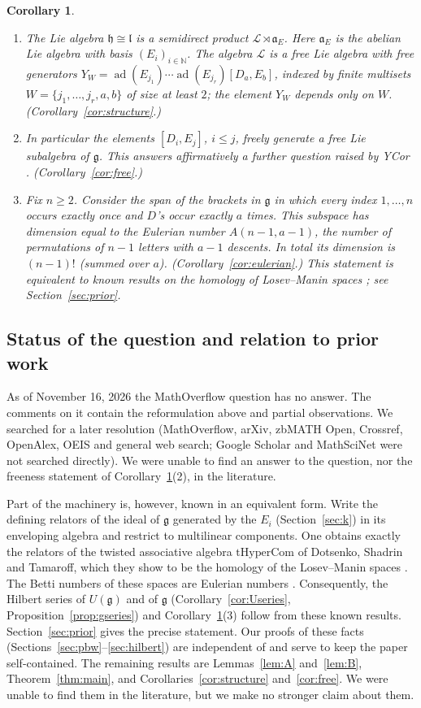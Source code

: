 \documentclass[11pt]{amsart}
\newtheorem{corollary}[theorem]{Corollary}
\theoremstyle{definition}
\theoremstyle{remark}
\newcommand{\N}{\mathbb{N}}
\newcommand{\g}{\mathfrak{g}}
\newcommand{\h}{\mathfrak{h}}
\newcommand{\lie}{\mathfrak{l}}
\newcommand{\af}{\mathfrak{a}}
\newcommand{\Lf}{\mathcal{L}}
\newcommand{\ad}{\operatorname{ad}}
\begin{document}
\begin{corollary}\label{cor:intro}
\begin{enumerate}
\item The Lie algebra $\h\cong\lie$ is a semidirect product $\Lf\rtimes\af_E$. Here $\af_E$ is the abelian Lie algebra with basis $(E_i)_{i\in\N}$. The algebra $\Lf$ is a free Lie algebra with free generators $Y_W=\ad(E_{j_1})\cdots\ad(E_{j_r})[D_a,E_b]$, indexed by finite multisets $W=\{j_1,\dots,j_r,a,b\}$ of size at least $2$; the element $Y_W$ depends only on $W$. (Corollary~\ref{cor:structure}.)
\item In particular the elements $[D_i,E_j]$, $i\le j$, freely generate a free Lie subalgebra of $\g$. This answers affirmatively a further question raised by YCor \cite{YCor}. (Corollary~\ref{cor:free}.)
\item Fix $n\ge 2$. Consider the span of the brackets in $\g$ in which every index $1,\dots,n$ occurs exactly once and $D$'s occur exactly $a$ times. This subspace has dimension equal to the Eulerian number $A(n-1,a-1)$, the number of permutations of $n-1$ letters with $a-1$ descents. In total its dimension is $(n-1)!$ (summed over $a$). (Corollary~\ref{cor:eulerian}.) This statement is equivalent to known results on the homology of Losev--Manin spaces \cite{LM,DST}; see Section~\ref{sec:prior}.
\end{enumerate}
\end{corollary}

\subsection*{Status of the question and relation to prior work}
As of November 16, 2026 the MathOverflow question has no answer. The comments on it contain the reformulation above and partial observations. We searched for a later resolution (MathOverflow, arXiv, zbMATH Open, Crossref, OpenAlex, OEIS and general web search; Google Scholar and MathSciNet were not searched directly). We were unable to find an answer to the question, nor the freeness statement of Corollary~\ref{cor:intro}(2), in the literature.

Part of the machinery is, however, known in an equivalent form. Write the defining relators of the ideal of $\g$ generated by the $E_i$ (Section~\ref{sec:k}) in its enveloping algebra and restrict to multilinear components. One obtains exactly the relators of the twisted associative algebra $\mathrm{tHyperCom}$ of Dotsenko, Shadrin and Tamaroff, which they show to be the homology of the Losev--Manin spaces \cite[Prop.~2.4.2]{DST}. The Betti numbers of these spaces are Eulerian numbers \cite[Thm.~2.3]{LM}. Consequently, the Hilbert series of $U(\g)$ and of $\g$ (Corollary~\ref{cor:Useries}, Proposition~\ref{prop:gseries}) and Corollary~\ref{cor:intro}(3) follow from these known results. Section~\ref{sec:prior} gives the precise statement. Our proofs of these facts (Sections~\ref{sec:pbw}--\ref{sec:hilbert}) are independent of \cite{LM,DST} and serve to keep the paper self-contained. The remaining results are Lemmas~\ref{lem:A} and~\ref{lem:B}, Theorem~\ref{thm:main}, and Corollaries~\ref{cor:structure} and~\ref{cor:free}. We were unable to find them in the literature, but we make no stronger claim about them.
\end{document}
